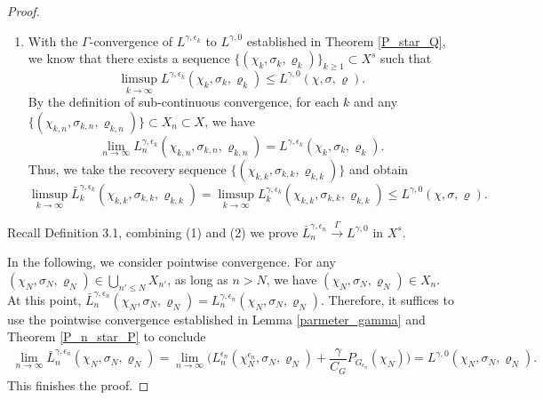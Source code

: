 \documentclass{amsart}
\begin{document}
\begin{proof}
\begin{enumerate}
        \item With the \(\Gamma\)-convergence of \( L^{\gamma,\epsilon_k} \) to \( L^{\gamma,0} \) established in Theorem \ref{P_star_Q}, we know that there exists a sequence \(\{(\chi_k, \sigma_k, \varrho_k)\}_{k\geq 1} \subset X^s\) such that
        \begin{equation}
        \limsup_{k\to\infty}L^{\gamma,\epsilon_k}(\chi_k, \sigma_k, \varrho_k)\leq L^{\gamma,0}(\chi, \sigma, \varrho).\nonumber
        \end{equation} 
        By the definition of sub-continuous convergence, for each \(k\) and any \(\{(\chi_{k,n}, \sigma_{k,n}, \varrho_{k,n})\} \subset X_n\subset X\), we have
        \begin{equation}
        \lim_{n\to\infty}L_n^{\gamma,\epsilon_k}(\chi_{k,n}, \sigma_{k,n}, \varrho_{k,n})= L^{\gamma,\epsilon_k}(\chi_k, \sigma_k, \varrho_k).\nonumber
        \end{equation} 
        Thus, we take the recovery sequence \(\{(\chi_{k,k}, \sigma_{k,k}, \varrho_{k,k})\}\) and obtain 
         \begin{equation}
         \limsup_{k\to\infty}\bar L_k^{\gamma,\epsilon_k}(\chi_{k,k}, \sigma_{k,k}, \varrho_{k,k})=\limsup_{k\to\infty}L_k^{\gamma,\epsilon_k}(\chi_{k,k}, \sigma_{k,k}, \varrho_{k,k})\leq L^{\gamma,0}(\chi, \sigma, \varrho).
         \nonumber
        \end{equation} 
    \end{enumerate}
    Recall Definition 3.1, combining (1) and (2) we prove $\bar L_n^{\gamma,\epsilon_n}\stackrel{\Gamma}{\longrightarrow} L^{\gamma,0}$ in $X^s$.

    In the following, we consider pointwise convergence. For any \((\chi_{N},\sigma_{N},\varrho_{N}) \in \bigcup_{n' \leq N} X_{n'}\), as long as \( n > N \), we have \((\chi_{N},\sigma_{N},\varrho_{N}) \in X_{n}\). At this point, \(\bar{L}_n^{\gamma,\epsilon_n}(\chi_{N},\sigma_{N},\varrho_{N}) = L_n^{\gamma,\epsilon_n}(\chi_{N},\sigma_{N},\varrho_{N})\). Therefore, it suffices to use the pointwise convergence established in Lemma \ref{parmeter_gamma} and Theorem \ref{P_n_star_P} to conclude 
    \begin{align*}
        \lim_{n\to\infty}\bar{L}_n^{\gamma,\epsilon_n}(\chi_{N},\sigma_{N},\varrho_{N}) = \lim_{n\to\infty}\Big(L_n^{\epsilon_n}(\chi_{N}^{\epsilon_n},\sigma_{N},\varrho_{N})+\dfrac{\gamma}{C_G}P_{G_{\epsilon_n}}(\chi_N)\Big)=L^{\gamma,0}(\chi_{N},\sigma_{N},\varrho_{N}).
    \end{align*}
    This finishes the proof.
\end{proof}
\end{document}
